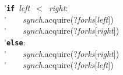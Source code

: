 \'\>\texttt{\textbf{if}}~\textit{left}~$<$~\textit{right}:\\

\'\>~~~~\textit{synch}.acquire(?\textit{forks}[\textit{left}])\\

\'\>~~~~\textit{synch}.acquire(?\textit{forks}[\textit{right}])\\

\'\>\texttt{\textbf{else}}:\\

\'\>~~~~\textit{synch}.acquire(?\textit{forks}[\textit{right}])\\

\'\>~~~~\textit{synch}.acquire(?\textit{forks}[\textit{left}])